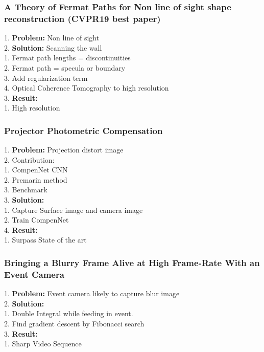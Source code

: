 \subsubsection{A Theory of Fermat Paths for Non line of sight shape reconstruction (CVPR19 best paper)}
    1. {\bf Problem:} Non line of sight \\
    2. {\bf Solution:} Scanning the wall \\
        1. Fermat path lengths = discontinuities \\
        2. Fermat path = specula or boundary \\
        3. Add regularization term \\
        4. Optical Coherence Tomography to high resolution \\
    3. {\bf Result:}  \\
        1. High resolution \\
\subsubsection{Projector Photometric Compensation}
    1. {\bf Problem:} Projection distort image \\
    2. Contribution:  \\
        1. CompenNet CNN \\
        2. Premarin method \\
        3. Benchmark \\
    3. {\bf Solution:} \\
        1. Capture Surface image and camera image \\
        2. Train CompenNet \\
    4. {\bf Result:} \\
        1. Surpass State of the art \\
\subsubsection{Bringing a Blurry Frame Alive at High Frame-Rate With an Event Camera}
    1. {\bf Problem:} Event camera likely to capture blur image \\
    2. {\bf Solution:}  \\
        1. Double Integral while feeding in event. \\
        2. Find gradient descent by Fibonacci search \\
    3. {\bf Result:} \\
        1. Sharp Video Sequence \\

